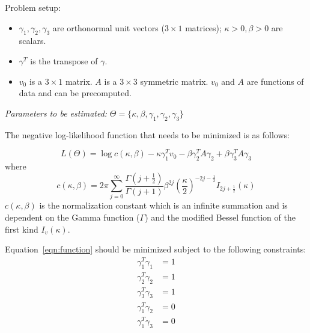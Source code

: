 \documentclass[a4paper,10pt]{report}
\numberwithin{equation}{chapter}
\begin{document}
\noindent Problem setup: \\

\begin{itemize}
\item $\gamma_1,\gamma_2,\gamma_3$ are orthonormal unit vectors ($3\times 1$ matrices); $\kappa > 0, \beta > 0$ are scalars.

\item $\gamma^T$ is the transpose of $\gamma$.

\item $v_0$ is a $3\times 1$ matrix. $A$ is a $3\times 3$ symmetric matrix. 
$v_0$ and $A$ are functions of data and can be precomputed.
\end{itemize}

\emph{Parameters to be estimated: } $\Theta = \{\kappa,\beta,\gamma_1,\gamma_2,\gamma_3\}$

The negative log-likelihood function that needs to be minimized is as follows:

\begin{equation}
L(\Theta) = \log c(\kappa,\beta) - \kappa \gamma_1^T v_0 - \beta \gamma_2^T A \gamma_2 + \beta \gamma_3^T A \gamma_3 \label{eqn:function}
\end{equation}
where
\begin{equation}
c(\kappa,\beta) = 2\pi \sum_{j=0}^{\infty} \frac{\Gamma(j+\frac{1}{2})}{\Gamma(j+1)} \beta^{2j} \left(\frac{\kappa}{2}\right)^{-2j-\frac{1}{2}} I_{2j+\frac{1}{2}}(\kappa)
\end{equation}
$c(\kappa,\beta)$ is the normalization constant which is an infinite summation
and is dependent on the Gamma function ($\Gamma$) and the modified Bessel function
of the first kind $I_v(\kappa)$. 

Equation~\ref{eqn:function} should be minimized subject to the following constraints:
\begin{align*}
\gamma_1^T \gamma_1 &= 1 \\
\gamma_2^T \gamma_2 &= 1 \\
\gamma_3^T \gamma_3 &= 1 \\
\gamma_1^T \gamma_2 &= 0 \\
\gamma_1^T \gamma_3 &= 0 \\
\end{align*}
\end{document}
